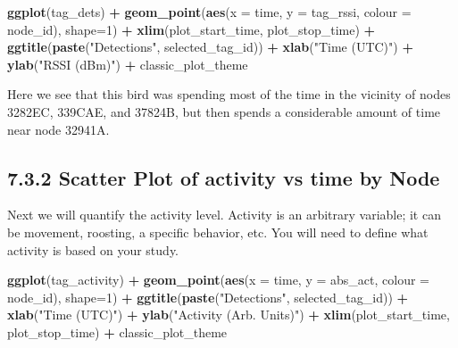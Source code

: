 \documentclass[
]{book}
\newenvironment{Shaded}{\begin{snugshade}}{\end{snugshade}}
\newcommand{\AttributeTok}[1]{\textcolor[rgb]{0.13,0.29,0.53}{#1}}
\newcommand{\DecValTok}[1]{\textcolor[rgb]{0.00,0.00,0.81}{#1}}
\newcommand{\FunctionTok}[1]{\textcolor[rgb]{0.13,0.29,0.53}{\textbf{#1}}}
\newcommand{\NormalTok}[1]{#1}
\newcommand{\SpecialCharTok}[1]{\textcolor[rgb]{0.81,0.36,0.00}{\textbf{#1}}}
\newcommand{\StringTok}[1]{\textcolor[rgb]{0.31,0.60,0.02}{#1}}
\begin{document}
\begin{Shaded}
\begin{Highlighting}[]
\FunctionTok{ggplot}\NormalTok{(tag\_dets) }\SpecialCharTok{+}
  \FunctionTok{geom\_point}\NormalTok{(}\FunctionTok{aes}\NormalTok{(}\AttributeTok{x =}\NormalTok{ time, }
                 \AttributeTok{y =}\NormalTok{ tag\_rssi, }
                 \AttributeTok{colour =}\NormalTok{ node\_id), }
             \AttributeTok{shape=}\DecValTok{1}\NormalTok{) }\SpecialCharTok{+}
  \FunctionTok{xlim}\NormalTok{(plot\_start\_time, plot\_stop\_time) }\SpecialCharTok{+}
  \FunctionTok{ggtitle}\NormalTok{(}\FunctionTok{paste}\NormalTok{(}\StringTok{"Detections"}\NormalTok{, selected\_tag\_id)) }\SpecialCharTok{+}
  \FunctionTok{xlab}\NormalTok{(}\StringTok{"Time (UTC)"}\NormalTok{) }\SpecialCharTok{+} 
  \FunctionTok{ylab}\NormalTok{(}\StringTok{"RSSI (dBm)"}\NormalTok{) }\SpecialCharTok{+}
\NormalTok{  classic\_plot\_theme}
\end{Highlighting}
\end{Shaded}

Here we see that this bird was spending most of the time in the vicinity of nodes 3282EC, 339CAE, and 37824B, but then spends a considerable amount of time near node 32941A.

\subsection{7.3.2 Scatter Plot of activity vs time by Node}\label{scatter-plot-of-activity-vs-time-by-node}

Next we will quantify the activity level. Activity is an arbitrary variable; it can be movement, roosting, a specific behavior, etc. You will need to define what activity is based on your study.

\begin{Shaded}
\begin{Highlighting}[]
\FunctionTok{ggplot}\NormalTok{(tag\_activity) }\SpecialCharTok{+}
  \FunctionTok{geom\_point}\NormalTok{(}\FunctionTok{aes}\NormalTok{(}\AttributeTok{x =}\NormalTok{ time, }
                 \AttributeTok{y =}\NormalTok{ abs\_act, }
                 \AttributeTok{colour =}\NormalTok{ node\_id), }
             \AttributeTok{shape=}\DecValTok{1}\NormalTok{) }\SpecialCharTok{+}
  \FunctionTok{ggtitle}\NormalTok{(}\FunctionTok{paste}\NormalTok{(}\StringTok{"Detections"}\NormalTok{, selected\_tag\_id)) }\SpecialCharTok{+}
  \FunctionTok{xlab}\NormalTok{(}\StringTok{"Time (UTC)"}\NormalTok{) }\SpecialCharTok{+}
  \FunctionTok{ylab}\NormalTok{(}\StringTok{"Activity (Arb. Units)"}\NormalTok{) }\SpecialCharTok{+}
  \FunctionTok{xlim}\NormalTok{(plot\_start\_time, plot\_stop\_time) }\SpecialCharTok{+}
\NormalTok{  classic\_plot\_theme}
\end{Highlighting}
\end{Shaded}
\end{document}
